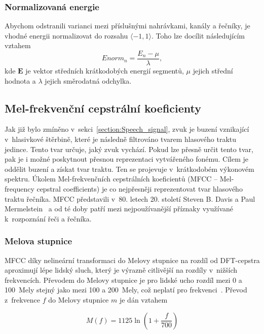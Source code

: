 \subsubsection{Normalizovaná energie}
Abychom odstranili varianci mezi příslušnými nahrávkami, kanály a řečníky, je vhodné energii normalizovat do rozsahu $\langle-1,1\rangle$. Toho lze docílit následujícím vztahem
\begin{equation}
\label{eqn:Energy_norm}
    Enorm_{n} = \frac{E_{n} - \mu}{\lambda},
\end{equation}
kde $\mathbf{E}$ je vektor středních krátkodobých energií segmentů, $\mu$ jejich střední hodnota a $\lambda$ jejich směrodatná odchylka.


\subsection{Mel-frekvenční cepstrální koeficienty}
\label{subsection:MFCC}
Jak již bylo zmíněno v~sekci~\ref{section:Speech_signal}, zvuk je buzení vznikající v~hlasivkové štěrbině, které je následně filtrováno tvarem hlasového traktu jedince. Tento tvar určuje, jaký zvuk vychází. Pokud lze přesně určit tento tvar, pak je i možné poskytnout přesnou reprezentaci vytvářeného fonému. Cílem je oddělit buzení a získat tvar traktu. Ten se projevuje v~krátkodobém výkonovém spektru. Úkolem Mel-frekvenčních cepstrálních koeficientů (MFCC -- Mel-frequency cepstral coefficients) je co nejpřesněji reprezentovat tvar hlasového traktu řečníka. MFCC představili v~80. letech 20. století Steven B. Davis a Paul Mermelstein~\cite{Davis_Mermelstein_MFCC} a od té doby patří mezi nejpoužívanější příznaky využívané k~rozpoznání řeči a řečníka.

\subsubsection{Melova stupnice}
MFCC díky nelineární transformaci do Melovy stupnice na rozdíl od DFT-cepstra aproximují lépe lidský sluch, který je výrazně citlivější na rozdíly v~nižších frekvencích. Převodem do Melovy stupnice je pro lidské ucho rozdíl mezi 0 a 100~Mely stejný jako mezi 100 a 200~Mely, což neplatí pro frekvenci~\cite{huang_acero_hon_2005}. Převod z~frekvence $f$ do Melovy stupnice $m$ je dán vztahem

\begin{equation}
\label{eqn:Freq_to_mel}
    M(f) = 1125 \ln(1 + \frac{f}{700})
\end{equation}

